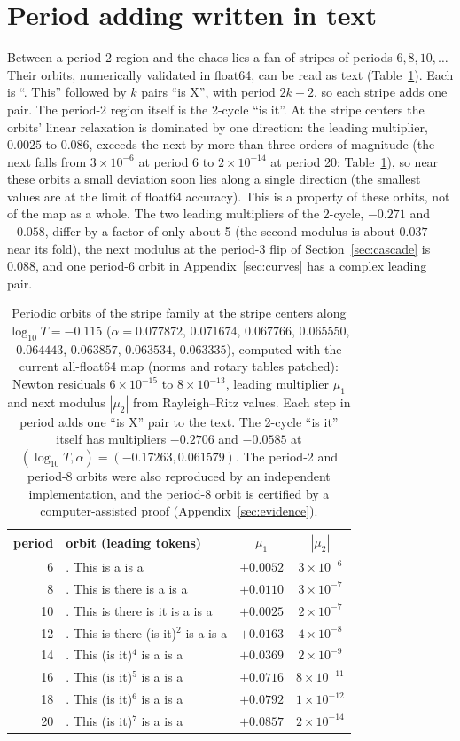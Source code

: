 \documentclass[11pt,letterpaper]{article}
\begin{document}
\section{Period adding written in text}
\label{sec:adding}
Between a period-2 region and the chaos lies a fan of stripes of periods $6, 8, 10, \dots$ Their orbits, numerically
validated in float64, can be read as text (Table~\ref{tab:orbits}). Each is ``. This'' followed by $k$ pairs ``is
X'', with period $2k+2$, so each stripe adds one pair. The period-2 region itself is the 2-cycle ``is it''. At the stripe centers the orbits' linear relaxation is dominated by one direction: the leading multiplier, $0.0025$ to $0.086$, exceeds the
next by more than three orders of magnitude (the next falls from $3\times10^{-6}$ at period 6 to $2\times10^{-14}$ at
period 20; Table~\ref{tab:orbits}), so near these orbits a small deviation soon lies along a single direction (the
smallest values are at the limit of float64 accuracy). This is a property of these
orbits, not of the map as a whole. The two leading multipliers of the 2-cycle, $-0.271$ and $-0.058$, differ by a
factor of only about 5 (the second modulus is about $0.037$ near its fold),
the next modulus at the period-3 flip of Section~\ref{sec:cascade} is $0.088$, and one period-6 orbit in
Appendix~\ref{sec:curves} has a complex leading pair.
\begin{table}[H]
\centering\small
\begin{tabular}{rlcc}
\toprule
period & orbit (leading tokens) & $\mu_1$ & $|\mu_2|$ \\
\midrule
6 & . This is a is a & $+0.0052$ & $3\times10^{-6}$ \\
8 & . This is there is a is a & $+0.0110$ & $3\times10^{-7}$ \\
10 & . This is there is it is a is a & $+0.0025$ & $2\times10^{-7}$ \\
12 & . This is there (is it)$^2$ is a is a & $+0.0163$ & $4\times10^{-8}$ \\
14 & . This (is it)$^4$ is a is a & $+0.0369$ & $2\times10^{-9}$ \\
16 & . This (is it)$^5$ is a is a & $+0.0716$ & $8\times10^{-11}$ \\
18 & . This (is it)$^6$ is a is a & $+0.0792$ & $1\times10^{-12}$ \\
20 & . This (is it)$^7$ is a is a & $+0.0857$ & $2\times10^{-14}$ \\
\bottomrule
\end{tabular}
\caption{Periodic orbits of the stripe family at the stripe centers along $\log_{10}T=-0.115$
($\alpha=0.077872$, $0.071674$, $0.067766$, $0.065550$, $0.064443$, $0.063857$, $0.063534$, $0.063335$), computed with the
current all-float64 map (norms and rotary tables patched): Newton residuals $6\times10^{-15}$ to $8\times10^{-13}$,
leading multiplier $\mu_1$ and next modulus $|\mu_2|$ from Rayleigh--Ritz values. Each step in period adds one ``is
X'' pair to the text. The 2-cycle ``is it'' itself has multipliers $-0.2706$ and $-0.0585$ at
$(\log_{10}T,\alpha)=(-0.17263,0.061579)$. The period-2 and period-8 orbits were also reproduced by an independent
implementation, and the period-8 orbit is certified by a computer-assisted proof (Appendix~\ref{sec:evidence}).}
\label{tab:orbits}
\end{table}
\end{document}
